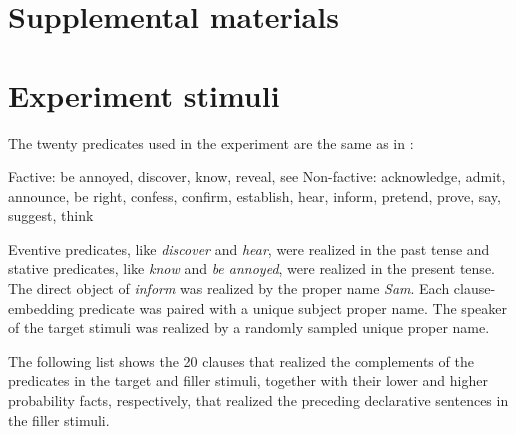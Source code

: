 \documentclass[11pt,fleqn]{article}
\newcommand{\6}{\mbox{$[\hspace*{-.6mm}[$}}
\newcommand{\9}{\mbox{$]\hspace*{-.6mm}]$}}
\begin{document}

%


\newpage

\section*{Supplemental materials}

\appendix

\setcounter{page}{1}

\setcounter{table}{0}
\renewcommand{\thetable}{A\arabic{table}}

\setcounter{figure}{0}
\renewcommand{\thefigure}{A\arabic{figure}}

\section{Experiment stimuli}\label{a:clauses}

The twenty predicates used in the experiment are the same as in \citealt{degen-tonhauser-openmind,degen-tonhauser-language}:

\begin{exe}
\ex\label{predicates}
\begin{xlist}
\ex Factive: be annoyed, discover, know, reveal, see
\ex Non-factive: acknowledge, admit, announce, be right, confess, confirm, establish, hear, inform, pretend, prove, say, suggest, think
\end{xlist}
\end{exe}

Eventive predicates, like {\em discover} and {\em hear}, were realized in the past tense and stative predicates, like {\em know} and {\em be annoyed}, were realized in the present tense. The direct object of {\em inform} was realized by the proper name {\em Sam}. Each clause-embedding predicate was paired with a unique subject proper name. The speaker of the target stimuli was realized by a randomly sampled unique proper name. 

The following list shows the 20 clauses that realized the complements of the predicates in the target and filler stimuli, together with their lower and higher probability facts, respectively, that realized the preceding declarative sentences in the filler stimuli.
\end{document}
